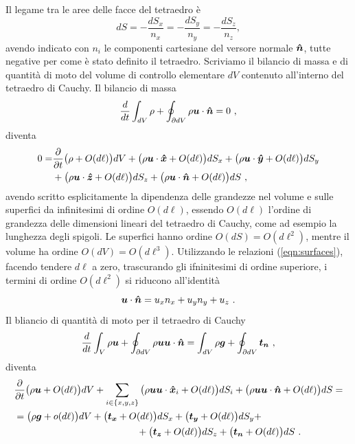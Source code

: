 Il legame tra le aree delle facce del tetraedro è
\begin{equation}\label{eqn:surfaces}
 dS = - \dfrac{dS_x}{n_x} = - \dfrac{dS_y}{n_y} = - \dfrac{dS_z}{n_z} ,
\end{equation}
avendo indicato con $n_i$ le componenti cartesiane del versore normale $\bm{\hat{n}}$, tutte negative per come è stato definito il tetraedro.
Scriviamo il bilancio di massa e di quantità di moto del volume di controllo elementare $dV$ contenuto all'interno del tetraedro di Cauchy. Il bilancio di massa
\begin{equation}
 \frac{d}{dt} \int_{dV} \rho + \oint_{\partial dV} \rho \bm{u} \cdot \bm{\hat{n}} = 0 \ ,
\end{equation}
diventa
\begin{equation}\label{eqn:dV:mass}
\begin{aligned}
 0 = & \dfrac{\partial{}}{\partial{t}}\big( \rho + O(d\ell) \big) dV
     + \big( \rho \bm{u} \cdot \bm{\hat{x}} + O(d\ell) \big) dS_x
     + \big( \rho \bm{u} \cdot \bm{\hat{y}} + O(d\ell) \big) dS_y \\
   & + \big( \rho \bm{u} \cdot \bm{\hat{z}} + O(d\ell) \big) dS_z
     + \big( \rho \bm{u} \cdot \bm{\hat{n}} + O(d\ell) \big) dS \ ,
\end{aligned}
\end{equation}
avendo scritto esplicitamente la dipendenza delle grandezze nel volume e sulle superfici da infinitesimi di ordine $O(d\ell)$, essendo $O(d\ell)$ l'ordine di grandezza delle dimensioni lineari del tetraedro di Cauchy, come ad esempio la lunghezza degli spigoli. Le superfici hanno ordine $O(dS) = O(d\ell^2)$, mentre il volume ha ordine $O(dV) = O(d\ell^3)$. Utilizzando le relazioni (\ref{eqn:surfaces}), facendo tendere $d\ell$ a zero, trascurando gli ifninitesimi di ordine superiore, i termini di ordine $O(d\ell^2)$ si riducono all'identità
\begin{equation}
 \bm{u} \cdot \bm{\hat{n}} = u_x n_x + u_y n_y + u_z \ .
\end{equation}
Il bliancio di quantità di moto per il tetraedro di Cauchy
\begin{equation}
 \frac{d}{dt} \int_V \rho \bm{u} + \oint_{\partial dV} \rho \bm{u} \bm{u} \cdot \bm{\hat{n}} = \int_{dV} \rho \bm{g} + \oint_{\partial dV} \bm{t_n} \ ,
\end{equation}
diventa
\begin{equation}
\begin{aligned}
 & \p{}{t} \big( \rho \bm{u} + O(d\ell) \big)dV +
 \sum_{i \in \{x,y,z\}} \big( \rho \bm{u} \bm{u} \cdot \bh{x}_i + O(d\ell) \big)dS_i +
                \big( \rho \bm{u} \bm{u} \cdot \bh{n}   + O(d\ell) \big)dS   = \\
 & = \big( \rho \bm{g} + o(d\ell) \big) dV +
     \big( \bm{t_x} + O(d\ell) \big) dS_x +
     \big( \bm{t_y} + O(d\ell) \big) dS_y + \\
 & \hspace{4.5cm} + \big( \bm{t_z} + O(d\ell) \big) dS_z +
     \big( \bm{t_n} + O(d\ell) \big) dS \ .
\end{aligned}
\end{equation}
